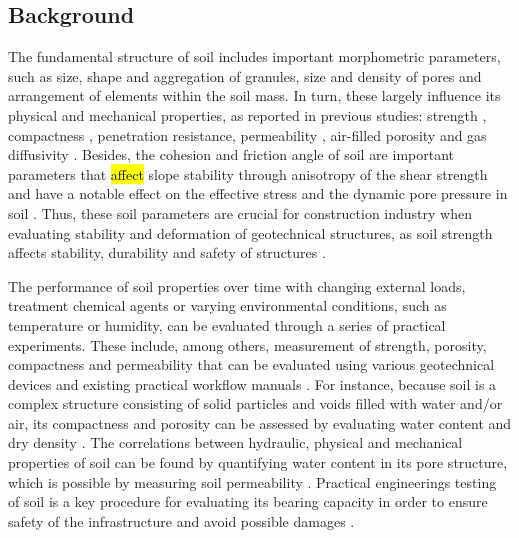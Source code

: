 \documentclass{amestyle}
\begin{document}
\subsection{Background} 
The fundamental structure of soil includes important morphometric parameters, such as size, shape and aggregation of granules, size and density of pores and arrangement of elements within the soil mass. In turn, these largely influence its physical and mechanical properties, as reported in previous studies: strength \cite{5775686}, compactness \cite{5774579,9082607,WANG2022100703}, penetration resistance, permeability \cite{GAO2022100754,CHOONG2022107075}, air-filled porosity \cite{POHL2021115124,ZHANG2021105738,ZIEGLERRIVERA2021103194} and gas diffusivity \cite{Ball}. Besides, the cohesion \cite{Deviren,KIM2021106163} and friction angle of soil \cite{MARZULLI2021813,ZOU20191,KAYA2009252} are important parameters that \hl{affect} slope stability through anisotropy of the shear strength \cite{WANG20161055,STOCKTON201931} and have a notable effect on the effective stress and the dynamic pore pressure in soil \cite{YE2012111}. Thus, these soil parameters are crucial for construction industry when evaluating stability and deformation of geotechnical structures, as soil strength affects stability, durability and safety of structures \cite{747690,6802685,KULKARNI2022125363,ZHANG2020119293,WANG2022100703}. 

The performance of soil properties over time with changing external loads, treatment chemical agents or varying environmental conditions, such as temperature or humidity, can be evaluated through a series of practical experiments. These include, among others, measurement of strength, porosity, compactness and permeability that can be evaluated using various geotechnical devices and existing practical workflow manuals \cite{Day2001,Davis2008}. For instance, because soil is a complex structure consisting of solid particles and voids filled with water and/or air, its compactness and porosity can be assessed by evaluating water content and dry density \cite{Hillel}. The correlations between hydraulic, physical and mechanical properties of soil can be found by quantifying water content in its pore structure, which is possible by measuring soil permeability \cite{BARBOSA2022115673}. Practical engineerings testing of soil is a key procedure for evaluating its bearing capacity in order to ensure safety of the infrastructure and avoid possible damages \cite{OBIANYO2020120677,BAKAIYANG2021e00626,HAN20181187,KAMAL20212660}. 
\end{document}

